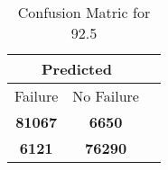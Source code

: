 \begin{table}[] 
\caption{Confusion Matric for 92.5} 
\label{Table: Prediction Accuracy-DMD92.5OnlySunEKF-ignoreReflection-Reflection} 
\centering 
\begin{tabular} 
 {@{}ccc@{}} 
\toprule 
\multicolumn{2}{c}{\textbf{Predicted}}
 \\ \midrule 
\multicolumn{1}{|c|}{Failure} & 
\multicolumn{1}{c|}{No Failure}
 \\ \midrule 
\multicolumn{1}{|c|}{\color{green}\textbf{81067}} & 
\multicolumn{1}{c|}{\color{red}\textbf{6650}}
 \\ \midrule 
\multicolumn{1}{|c|}{\color{red}\textbf{6121}} & 
\multicolumn{1}{c|}{\color{green}\textbf{76290}}
 \\ \bottomrule 
\end{tabular} 
\end{table} 
